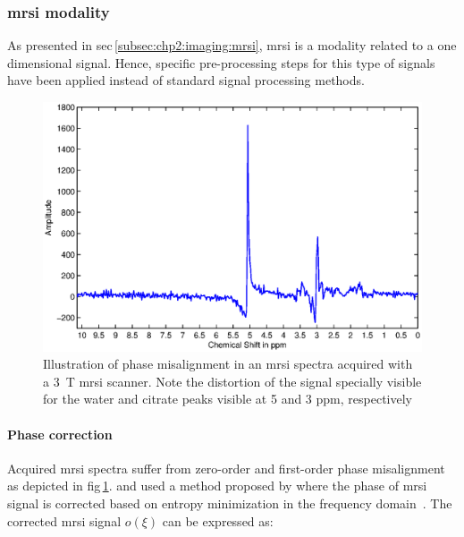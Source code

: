 
\subsubsection{\acs*{mrsi} modality}

As presented in \acs{sec}\,\ref{subsec:chp2:imaging:mrsi}, \ac{mrsi} is a modality related to a one dimensional signal.
Hence, specific pre-processing steps for this type of signals have been applied instead of standard signal processing methods.


\begin{figure}
  \centering
  \includegraphics[width=0.7\linewidth]{3_review/figures/processing/pre-processing/phase/phase.eps}
  \caption[Illustration of phase malignant in an \acs*{mrsi} spectra.]{Illustration of phase misalignment in an \acs*{mrsi} spectra acquired with a \SI{3}{\tesla} \ac*{mrsi} scanner. Note the distortion of the signal specially visible for the water and citrate peaks visible at 5 and 3 ppm, respectively}
  \label{fig:phase}
\end{figure}

\paragraph{Phase correction} Acquired \ac{mrsi} spectra suffer from zero-order and first-order phase misalignment~\cite{Chen2002,Osorio-Garcia2012} as depicted in \acs{fig}\,\ref{fig:phase}. 
\citeauthor{Parfait2012} and \citeauthor{trigui2017automatic} used a method proposed by \citeauthor{Chen2002} where the phase of \ac{mrsi} signal is corrected based on entropy minimization in the frequency domain~\cite{Parfait2012,trigui2016classification,trigui2017automatic}.
The corrected \ac{mrsi} signal $o(\xi)$ can be expressed as:

